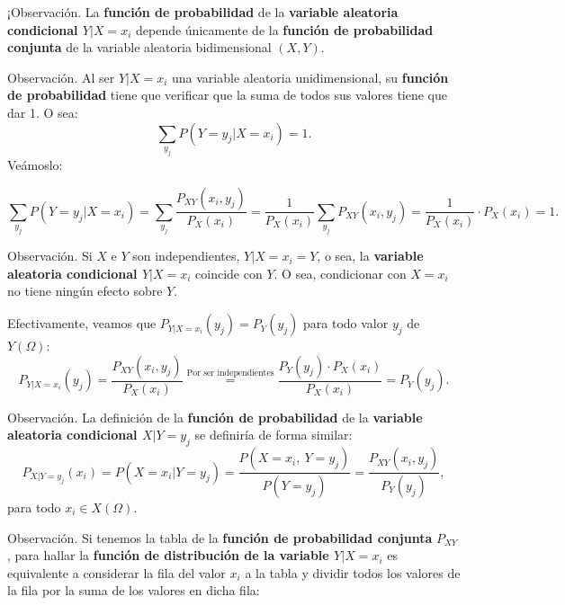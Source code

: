 \documentclass[]{book}
\begin{document}
¡Observación.
La \textbf{función de probabilidad} de la \textbf{variable aleatoria condicional \(Y|X=x_i\)} depende únicamente de la \textbf{función de probabilidad conjunta} de la variable aleatoria bidimensional \((X,Y)\).

Observación.
Al ser \(Y|X=x_i\) una variable aleatoria unidimensional, su \textbf{función de probabilidad} tiene que verificar que la suma de todos sus valores tiene que dar 1. O sea:
\[
\sum_{y_j} P(Y=y_j|X=x_i)=1.
\]
Veámoslo:

\[
\sum_{y_j} P(Y=y_j|X=x_i)=\sum_{y_j} \frac{P_{XY}(x_i,y_j)}{P_X(x_i)}=\frac{1}{P_X(x_i)}\sum_{y_j} P_{XY}(x_i,y_j) =\frac{1}{P_X(x_i)}\cdot P_X(x_i)=1.
\]

Observación.
Si \(X\) e \(Y\) son independientes, \(Y|X=x_i =Y\), o sea, la \textbf{variable aleatoria condicional \(Y|X=x_i\)} coincide con \(Y\). O sea, condicionar con \(X=x_i\) no tiene ningún efecto sobre \(Y\).

Efectivamente, veamos que \(P_{Y|X=x_i}(y_j)=P_Y(y_j)\) para todo valor \(y_j\) de \(Y(\Omega)\):
\[
P_{Y|X=x_i}(y_j) =\frac{P_{XY}(x_i,y_j)}{P_X(x_i)} \stackrel{\mbox{Por ser independientes}}{=}\frac{P_Y(y_j)\cdot P_X(x_i)}{P_X(x_i)}=P_Y(y_j).
\]

Observación.
La definición de la \textbf{función de probabilidad} de la \textbf{variable aleatoria condicional \(X|Y=y_j\)} se definiría de forma similar:
\[
P_{X|Y=y_j}(x_i)=P(X=x_i|Y=y_j)=\frac{P(X=x_i,\ Y=y_j)}{P(Y=y_j)}=\frac{P_{XY}(x_i,y_j)}{P_Y(y_j)}, 
\]
para todo \(x_i\in X(\Omega)\).

Observación.
Si tenemos la tabla de la \textbf{función de probabilidad conjunta} \(P_{XY}\), para hallar la \textbf{función de distribución de la variable \(Y|X=x_i\)} es equivalente a considerar la fila del valor \(x_i\) a la tabla y dividir todos los valores de la fila por la suma de los valores en dicha fila:
\end{document}
